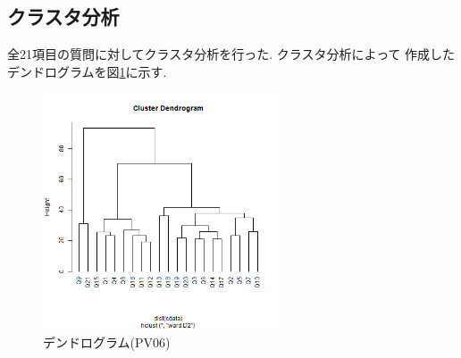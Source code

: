 \documentclass[12pt, a4j]{jsarticle}
\begin{document}
    \subsection{クラスタ分析}
      全21項目の質問に対してクラスタ分析を行った. クラスタ分析によって
      作成したデンドログラムを図\ref{fig:pv06_dendrogram}に示す. 

      \begin{figure}[htb]
        \centering
        \includegraphics[width=7cm]{../2nd/pv06/cluster.bmp}
        \caption{デンドログラム(PV06)}
        \label{fig:pv06_dendrogram}
      \end{figure}
  \section{}
\end{document}
